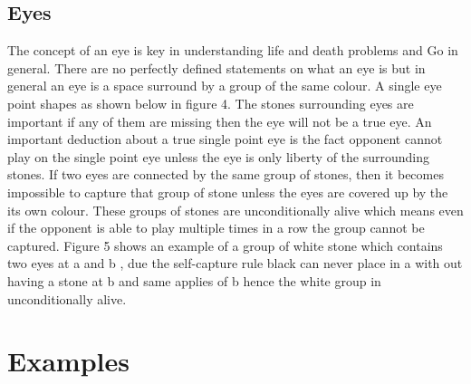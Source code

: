 \documentclass{l4proj}
\begin{document}
\subsection{Eyes}
The concept of an eye is key in understanding life and death problems and Go in general. There are no perfectly defined statements on what an eye is but in general an eye is a space surround by a group of the same colour. A single eye point shapes as shown below in figure 4. The stones surrounding eyes are important if any of them are missing then the eye will not be a true eye. An important deduction about a true single point eye is the fact opponent cannot play on the single point eye unless the eye is only liberty of the surrounding stones. If two eyes are connected by the same group of stones, then it becomes impossible to capture that group of stone unless the eyes are covered up by the its own colour. These groups of stones are unconditionally alive which means even if the opponent is  able to play multiple times in a row the group cannot be captured. Figure 5 shows an example of a group of white stone which contains two eyes at a and b , due the self-capture rule black can never place in a with out having a stone at b and same applies of b hence the white group in unconditionally alive.




\section{Examples}
\end{document}
